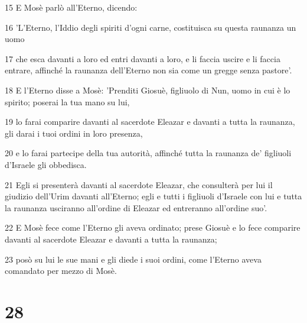 \par 15 E Mosè parlò all'Eterno, dicendo:
\par 16 'L'Eterno, l'Iddio degli spiriti d'ogni carne, costituisca su questa raunanza un uomo
\par 17 che esca davanti a loro ed entri davanti a loro, e li faccia uscire e li faccia entrare, affinché la raunanza dell'Eterno non sia come un gregge senza pastore'.
\par 18 E l'Eterno disse a Mosè: 'Prenditi Giosuè, figliuolo di Nun, uomo in cui è lo spirito; poserai la tua mano su lui,
\par 19 lo farai comparire davanti al sacerdote Eleazar e davanti a tutta la raunanza, gli darai i tuoi ordini in loro presenza,
\par 20 e lo farai partecipe della tua autorità, affinché tutta la raunanza de' figliuoli d'Israele gli obbedisca.
\par 21 Egli si presenterà davanti al sacerdote Eleazar, che consulterà per lui il giudizio dell'Urim davanti all'Eterno; egli e tutti i figliuoli d'Israele con lui e tutta la raunanza usciranno all'ordine di Eleazar ed entreranno all'ordine suo'.
\par 22 E Mosè fece come l'Eterno gli aveva ordinato; prese Giosuè e lo fece comparire davanti al sacerdote Eleazar e davanti a tutta la raunanza;
\par 23 posò su lui le sue mani e gli diede i suoi ordini, come l'Eterno aveva comandato per mezzo di Mosè.

\chapter{28}

